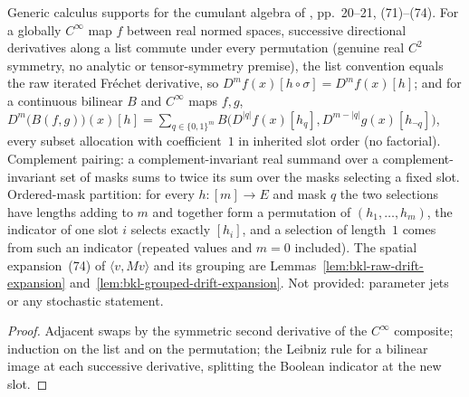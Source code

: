 \begin{lemma}
  \label{lem:iterated-derivative-symmetry-leibniz}
  \leanok
  Generic calculus supports for the cumulant algebra of \cite{BizeulKlartagLehec2026}, pp.~20--21,
  (71)--(74).  For a globally $C^\infty$ map $f$ between real normed spaces, successive directional
  derivatives along a list commute under every permutation (genuine real $C^2$ symmetry, no analytic or
  tensor-symmetry premise), the list convention equals the raw iterated Fr\'echet derivative, so
  $D^mf(x)[h\circ\sigma]=D^mf(x)[h]$; and for a continuous bilinear $B$ and $C^\infty$ maps $f,g$,
  $D^m\big(B(f,g)\big)(x)[h]=\sum_{q\in\{0,1\}^m}B\big(D^{|q|}f(x)[h_q],D^{m-|q|}g(x)[h_{\neg q}]\big)$,
  every subset allocation with coefficient~$1$ in inherited slot order (no factorial).  Complement pairing: a
  complement-invariant real summand over a complement-invariant set of masks sums to twice its sum over the masks
  selecting a fixed slot.  Ordered-mask partition: for every $h:[m]\to E$ and mask $q$ the two selections have
  lengths adding to $m$ and together form a permutation of $(h_1,\dots,h_m)$, the indicator of one slot $i$ selects
  exactly $[h_i]$, and a selection of length~$1$ comes from such an indicator (repeated values and $m=0$ included).
  The spatial expansion~(74) of $\langle v,Mv\rangle$ and its grouping are
  Lemmas~\ref{lem:bkl-raw-drift-expansion} and~\ref{lem:bkl-grouped-drift-expansion}.  Not provided: parameter jets
  or any stochastic statement.
\end{lemma}
\begin{proof}
  \leanok
  Adjacent swaps by the symmetric second derivative of the $C^\infty$ composite; induction on the list and on
  the permutation; the Leibniz rule for a bilinear image at each successive derivative, splitting the Boolean
  indicator at the new slot.
\end{proof}

